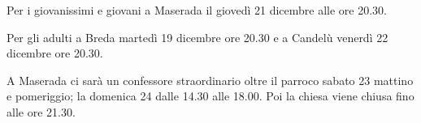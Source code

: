 \begin{center}
\begin{minipage}{0.72\textwidth}
Per i giovanissimi e giovani a Maserada il giovedì 21 dicembre alle ore 20.30.

Per gli adulti a Breda martedì 19 dicembre ore 20.30 e a Candelù venerdì 22 dicembre ore 20.30.

A Maserada ci sarà un confessore straordinario oltre il parroco sabato 23 mattino e pomeriggio; la domenica 24 dalle 14.30 alle 18.00. Poi la chiesa viene chiusa fino alle ore 21.30.
\end{minipage}

\end{center}


\normalsize
